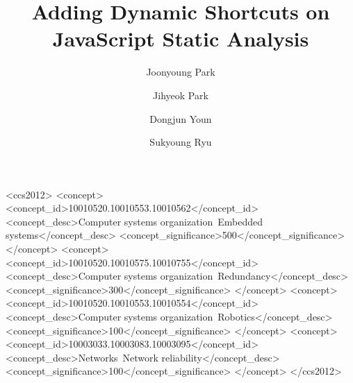 \documentclass[sigplan,10pt,review,anonymous]{acmart}\settopmatter{printfolios=true,printccs=false,printacmref=false}
\begin{document}
\title
[Dynamic Shortcut]
{Adding Dynamic Shortcuts on JavaScript Static Analysis}

\author{Joonyoung Park}

\author{Jihyeok Park}

\author{Dongjun Youn}

\author{Sukyoung Ryu}

\renewcommand{\shortauthors}{Park and Park, et al.}



\begin{CCSXML}
<ccs2012>
 <concept>
  <concept_id>10010520.10010553.10010562</concept_id>
  <concept_desc>Computer systems organization~Embedded systems</concept_desc>
  <concept_significance>500</concept_significance>
 </concept>
 <concept>
  <concept_id>10010520.10010575.10010755</concept_id>
  <concept_desc>Computer systems organization~Redundancy</concept_desc>
  <concept_significance>300</concept_significance>
 </concept>
 <concept>
  <concept_id>10010520.10010553.10010554</concept_id>
  <concept_desc>Computer systems organization~Robotics</concept_desc>
  <concept_significance>100</concept_significance>
 </concept>
 <concept>
  <concept_id>10003033.10003083.10003095</concept_id>
  <concept_desc>Networks~Network reliability</concept_desc>
  <concept_significance>100</concept_significance>
 </concept>
</ccs2012>
\end{CCSXML}


\keywords{\todo}

\maketitle












\end{document}
